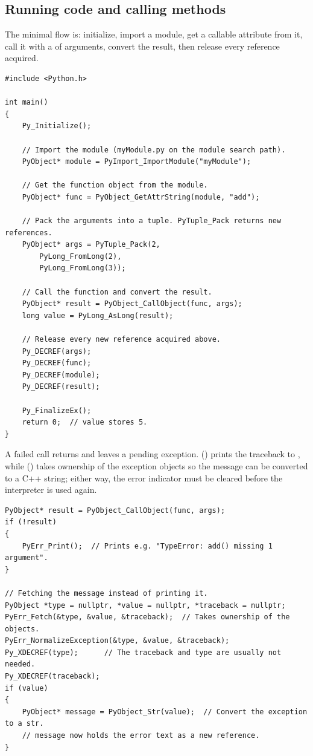 \subsection{Running code and calling methods}

The minimal flow is: initialize, import a module, get a callable attribute from it, call it with a  of arguments, convert the result, then release every reference acquired.
\begin{lstlisting}
#include <Python.h>

int main()
{
    Py_Initialize();

    // Import the module (myModule.py on the module search path).
    PyObject* module = PyImport_ImportModule("myModule");

    // Get the function object from the module.
    PyObject* func = PyObject_GetAttrString(module, "add");

    // Pack the arguments into a tuple. PyTuple_Pack returns new references.
    PyObject* args = PyTuple_Pack(2,
        PyLong_FromLong(2),
        PyLong_FromLong(3));

    // Call the function and convert the result.
    PyObject* result = PyObject_CallObject(func, args);
    long value = PyLong_AsLong(result);

    // Release every new reference acquired above.
    Py_DECREF(args);
    Py_DECREF(func);
    Py_DECREF(module);
    Py_DECREF(result);

    Py_FinalizeEx();
    return 0;  // value stores 5.
}
\end{lstlisting}
A failed call returns  and leaves a pending exception. () prints the traceback to , while () takes ownership of the exception objects so the message can be converted to a C++ string; either way, the error indicator must be cleared before the interpreter is used again.
\begin{lstlisting}
PyObject* result = PyObject_CallObject(func, args);
if (!result)
{
    PyErr_Print();  // Prints e.g. "TypeError: add() missing 1 argument".
}

// Fetching the message instead of printing it.
PyObject *type = nullptr, *value = nullptr, *traceback = nullptr;
PyErr_Fetch(&type, &value, &traceback);  // Takes ownership of the objects.
PyErr_NormalizeException(&type, &value, &traceback);
Py_XDECREF(type);      // The traceback and type are usually not needed.
Py_XDECREF(traceback);
if (value)
{
    PyObject* message = PyObject_Str(value);  // Convert the exception to a str.
    // message now holds the error text as a new reference.
}
\end{lstlisting}
